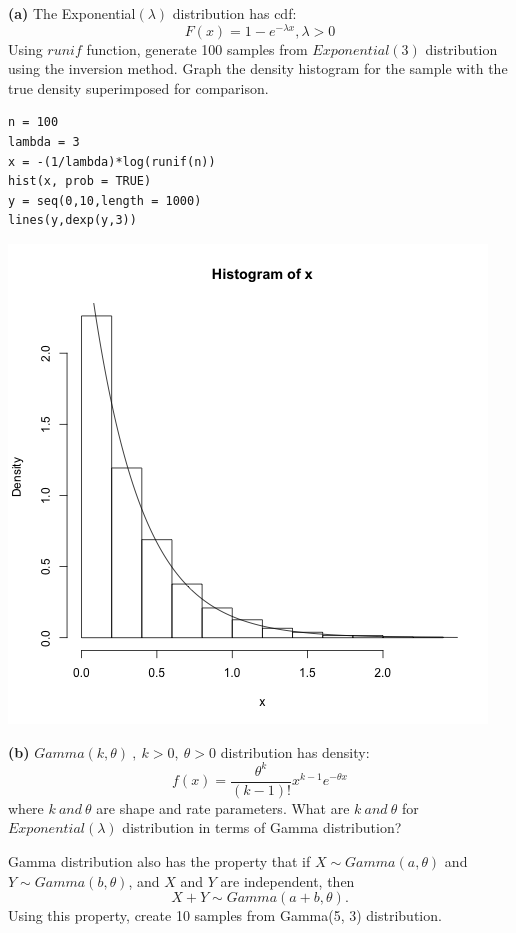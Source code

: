 \documentclass[letter,10.5pt]{article}
\numberwithin{equation}{subsection}
\begin{document}
\noindent \textbf{(a)} The Exponential$(\lambda)$ distribution has cdf:
\begin{equation*}
F(x) = 1 - e^{-\lambda x}, \lambda > 0
\end{equation*}
Using $runif$ function, generate 100 samples from $Exponential(3)$ distribution using the inversion method. Graph the density histogram for the sample with the true density superimposed for comparison.\\
\begin{boxedminipage}{\textwidth}
\scriptsize
\begin{verbatim}
n = 100
lambda = 3
x = -(1/lambda)*log(runif(n))
hist(x, prob = TRUE)
y = seq(0,10,length = 1000)
lines(y,dexp(y,3))
\end{verbatim}
\end{boxedminipage}
\begin{center}
\includegraphics[scale=0.3]{1a.png}
\end{center}
\noindent
\textbf{(b)} $Gamma(k, \theta)~,~k>0,~\theta>0$ distribution has density:
$$f(x) = \frac{\theta^k}{(k-1)!}x^{k-1}e^{-\theta x}$$
where $k~and~\theta$ are shape and rate parameters. What are $k~and~\theta$ for $Exponential(\lambda)$ distribution in terms of Gamma distribution?

Gamma distribution also has the property that if $X \sim Gamma(a, \theta)$ and $Y \sim Gamma(b, \theta)$, and $X$ and $Y$ are independent, then
$$X+Y \sim Gamma(a+b,\theta).$$ Using this property, create 10 samples from Gamma(5, 3) distribution.
\end{document}

